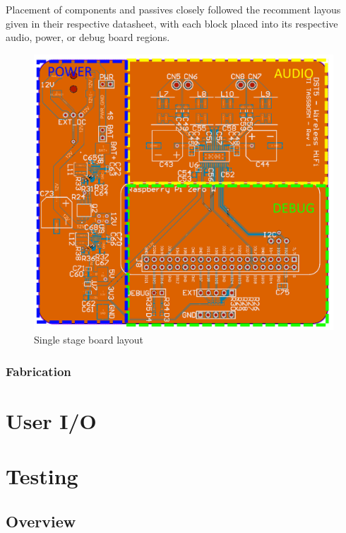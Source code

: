 \documentclass[main.tex]{subfiles}
\begin{document}
Placement of components and passives closely followed the recomment layous given in their respective datasheet, with each block placed into its respective audio, power, or debug board regions. 

\begin{figure}[H]
    \centering
    \includegraphics[scale=0.4]{./figs/ti-pcb.png}
    \caption{Single stage board layout}
    \label{fig:ti-pcb}
\end{figure}

\subsubsection{Fabrication}



\section{User I/O}
\section{Testing}
\subsection{Overview}
\end{document}
